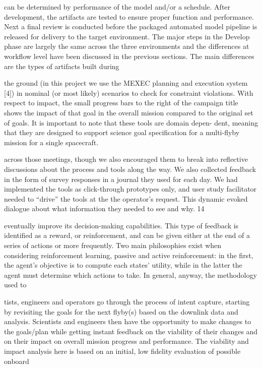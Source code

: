 \documentclass[a4paper,12pt]{article}
\begin{document}
can be determined by performance of the model and/or a schedule.
After development, the artifacts are tested to ensure proper function and performance. Next a ﬁnal review is conducted
before the packaged automated model pipeline is released for delivery to the target environment.
The major steps in the Develop phase are largely the same across the three environments and the diﬀerences at
workﬂow level have been discussed in the previous sections. The main diﬀerences are the types of artifacts built during

the ground (in this project we use the MEXEC planning and
execution system [4]) in nominal (or most likely) scenarios
to check for constraint violations. With respect to impact, the
small progress bars to the right of the campaign title shows
the impact of that goal in the overall mission compared to the
original set of goals.
It is important to note that these tools are domain depen-
dent, meaning that they are designed to support science goal
speciﬁcation for a multi-ﬂyby mission for a single spacecraft.

across those meetings, though we also encouraged them to
break into reﬂective discussions about the process and tools
along the way. We also collected feedback in the form of
survey responses in a journal they used for each day. We
had implemented the tools as click-through prototypes only,
and user study facilitator needed to “drive” the tools at the the
operator’s request. This dynamic evoked dialogue about what
information they needed to see and why.
14

eventually improve its decision-making capabilities. This type of feedback is 
identified as a reward, or reinforcement, and can be given either at the end of a 
series of actions or more frequently. Two main philosophies exist when considering 
reinforcement learning, passive and active reinforcement: in the first, the agent’s 
objective is to compute each states’ utility, while in the latter the agent must 
determine which actions to take. In general, anyway, the methodology used to

tists, engineers and operators go through the process of intent
capture, starting by revisiting the goals for the next ﬂyby(s)
based on the downlink data and analysis.
Scientists and
engineers then have the opportunity to make changes to the
goals/plan while getting instant feedback on the viability of
their changes and on their impact on overall mission progress
and performance. The viability and impact analysis here is
based on an initial, low ﬁdelity evaluation of possible onboard
\end{document}
